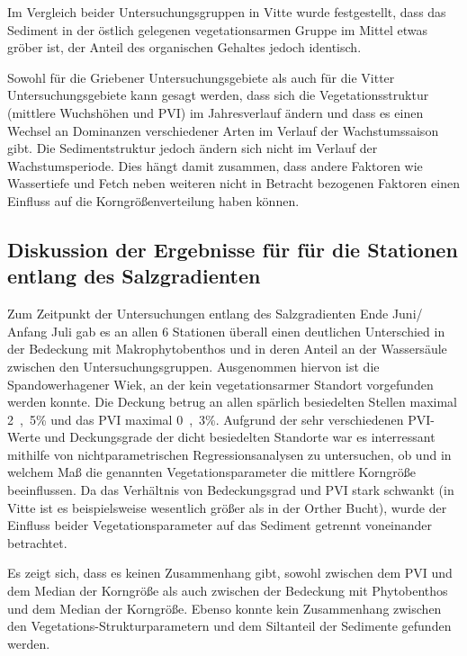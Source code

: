 Im Vergleich beider Untersuchungsgruppen in Vitte wurde festgestellt, dass das Sediment in der östlich gelegenen vegetationsarmen Gruppe im Mittel etwas gröber ist, der Anteil des organischen Gehaltes jedoch identisch. 

Sowohl für die Griebener Untersuchungsgebiete als auch für die Vitter Untersuchungsgebiete kann gesagt werden, dass sich die Vegetationsstruktur (mittlere Wuchshöhen und PVI) im Jahresverlauf ändern und dass es einen Wechsel an Dominanzen verschiedener Arten im Verlauf der Wachstumssaison gibt. Die Sedimentstruktur jedoch ändern sich nicht im Verlauf der Wachstumsperiode. Dies hängt damit zusammen, dass andere Faktoren wie Wassertiefe und Fetch neben weiteren nicht in Betracht bezogenen Faktoren einen Einfluss auf die Korngrößenverteilung haben können. 



\subsection{Diskussion der Ergebnisse für für die Stationen entlang des Salzgradienten}

Zum Zeitpunkt der Untersuchungen entlang des Salzgradienten Ende Juni/ Anfang Juli gab es an allen 6 Stationen überall einen deutlichen Unterschied in der Bedeckung mit Makrophytobenthos und in deren Anteil an der Wassersäule zwischen den Untersuchungsgruppen. Ausgenommen hiervon ist die Spandowerhagener Wiek, an der kein vegetationsarmer Standort vorgefunden werden konnte. Die Deckung betrug an allen spärlich besiedelten Stellen maximal \unit{2,5}{\%} und das PVI maximal \unit{0,3}{\%}. Aufgrund der sehr verschiedenen PVI- Werte und Deckungsgrade der dicht besiedelten Standorte war es interressant mithilfe von nichtparametrischen Regressionsanalysen zu untersuchen, ob und in welchem Maß die genannten Vegetationsparameter die mittlere Korngröße beeinflussen. Da das Verhältnis von Bedeckungsgrad und PVI stark schwankt (in Vitte ist es beispielsweise wesentlich größer als in der Orther Bucht), wurde der Einfluss beider Vegetationsparameter auf das Sediment getrennt voneinander betrachtet. 

Es zeigt sich, dass es keinen Zusammenhang gibt, sowohl zwischen dem PVI und dem Median der Korngröße als auch zwischen der Bedeckung mit Phytobenthos und dem Median der Korngröße. Ebenso konnte kein Zusammenhang zwischen den Vegetations-Strukturparametern und dem Siltanteil der Sedimente gefunden werden.

